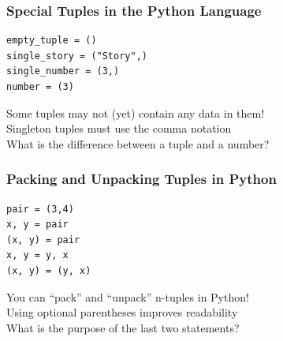 \documentclass[14pt,aspectratio=169]{beamer}
\begin{document}
%
\begin{frame}[fragile]
  \frametitle{Special Tuples in the Python Language}
  \normalsize
  \begin{minipage}{6in}
    \vspace*{.25in}
    \begin{verbatim}
empty_tuple = ()
single_story = ("Story",)
single_number = (3,)
number = (3)
    \end{verbatim}
  \end{minipage}
  \vspace*{.25in}
  \begin{center}
    \normalsize \noindent Some tuples may not (yet) contain any data in them! \\
    \normalsize \noindent Singleton tuples must use the comma notation\\
    \normalsize \noindent What is the difference between a tuple and a number? \\
  \end{center}
\end{frame}

%
\begin{frame}[fragile]
  \frametitle{Packing and Unpacking Tuples in Python}
  \normalsize
  \begin{minipage}{6in}
    \vspace*{.25in}
    \begin{verbatim}
pair = (3,4)
x, y = pair
(x, y) = pair
x, y = y, x
(x, y) = (y, x)
    \end{verbatim}
  \end{minipage}
  \vspace*{.1in}
  \begin{center}
    \normalsize \noindent You can ``pack'' and ``unpack'' n-tuples in Python! \\
    \normalsize \noindent Using optional parentheses improves readability \\
    \normalsize \noindent What is the purpose of the last two statements? \\
  \end{center}
\end{frame}
\end{document}
